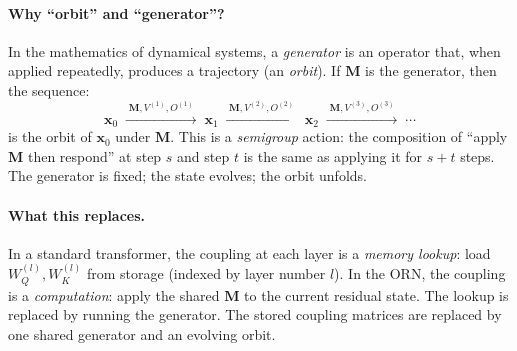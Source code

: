 \documentclass[11pt, a4paper]{article}
\newcommand{\M}{\mathbf{M}}
\newcommand{\x}{\mathbf{x}}
\theoremstyle{remark}
\begin{document}
\paragraph{Why ``orbit'' and ``generator''?}
In the mathematics of dynamical systems, a \emph{generator} is an operator that, when applied repeatedly, produces a trajectory (an \emph{orbit}).
If $\M$ is the generator, then the sequence:
\[
    \x_0 \;\xrightarrow{\;\M, V^{(1)}, O^{(1)}\;}\; \x_1 \;\xrightarrow{\;\M, V^{(2)}, O^{(2)}\;}\; \x_2 \;\xrightarrow{\;\M, V^{(3)}, O^{(3)}\;}\; \cdots
\]
is the orbit of $\x_0$ under $\M$.
This is a \emph{semigroup} action: the composition of ``apply $\M$ then respond'' at step $s$ and step $t$ is the same as applying it for $s{+}t$ steps.
The generator is fixed; the state evolves; the orbit unfolds.

\paragraph{What this replaces.}
In a standard transformer, the coupling at each layer is a \emph{memory lookup}: load $W_Q^{(l)}, W_K^{(l)}$ from storage (indexed by layer number $l$).
In the ORN, the coupling is a \emph{computation}: apply the shared $\M$ to the current residual state.
The lookup is replaced by running the generator.
The stored coupling matrices are replaced by one shared generator and an evolving orbit.
\end{document}
